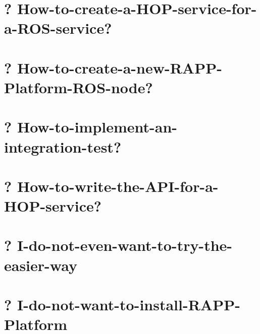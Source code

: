 \documentclass[twoside]{book}
\begin{document}
\chapter{? How-\/to-\/create-\/a-\/\-H\-O\-P-\/service-\/for-\/a-\/\-R\-O\-S-\/service?}
\label{md_rapp-platform_8wiki_How-to-create-a-HOP-service-for-a-ROS-service}
\hypertarget{md_rapp-platform_8wiki_How-to-create-a-HOP-service-for-a-ROS-service}{}

\chapter{? How-\/to-\/create-\/a-\/new-\/\-R\-A\-P\-P-\/\-Platform-\/\-R\-O\-S-\/node?}
\label{md_rapp-platform_8wiki_How-to-create-a-new-RAPP-Platform-ROS-node}
\hypertarget{md_rapp-platform_8wiki_How-to-create-a-new-RAPP-Platform-ROS-node}{}

\chapter{? How-\/to-\/implement-\/an-\/integration-\/test?}
\label{md_rapp-platform_8wiki_How-to-implement-an-integration-test}
\hypertarget{md_rapp-platform_8wiki_How-to-implement-an-integration-test}{}

\chapter{? How-\/to-\/write-\/the-\/\-A\-P\-I-\/for-\/a-\/\-H\-O\-P-\/service?}
\label{md_rapp-platform_8wiki_How-to-write-the-API-for-a-HOP-service}
\hypertarget{md_rapp-platform_8wiki_How-to-write-the-API-for-a-HOP-service}{}

\chapter{? I-\/do-\/not-\/even-\/want-\/to-\/try-\/the-\/easier-\/way}
\label{md_rapp-platform_8wiki_I-do-not-even-want-to-try-the-easier-way_8-Do-you-have-something-up-and-running-to-test}
\hypertarget{md_rapp-platform_8wiki_I-do-not-even-want-to-try-the-easier-way_8-Do-you-have-something-up-and-running-to-test}{}

\chapter{? I-\/do-\/not-\/want-\/to-\/install-\/\-R\-A\-P\-P-\/\-Platform}
\label{md_rapp-platform_8wiki_I-do-not-want-to-install-RAPP-Platform_8-Is-there-an-easier-way-to-use-it}
\hypertarget{md_rapp-platform_8wiki_I-do-not-want-to-install-RAPP-Platform_8-Is-there-an-easier-way-to-use-it}{}

\end{document}
